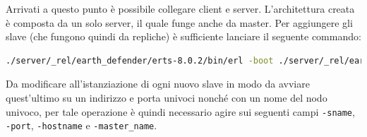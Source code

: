 \documentclass[paper=a4, fontsize=11pt]{scrartcl} %
\numberwithin{equation}{section} %
\numberwithin{figure}{section} %
\numberwithin{table}{section} %
\begin{document}
Arrivati a questo punto è possibile collegare client e server.
L'architettura creata è composta da un solo server, il quale funge anche da master. Per aggiungere gli slave (che fungono quindi da repliche) è sufficiente
lanciare il seguente commando:
\begin{lstlisting}[language=bash]
./server/_rel/earth_defender/erts-8.0.2/bin/erl -boot ./server/_rel/earth_defender/releases/1.0.0/earth_defender -sname 'ketchup' -setcookie 'earth_defender' -port 8889 -hostname "localhost" -role slave -master_name earth_defender@host
\end{lstlisting}
Da modificare all'istanziazione di ogni nuovo slave in modo da avviare quest'ultimo su un indirizzo e porta univoci nonché con un nome del nodo univoco, per tale operazione è quindi necessario agire sui seguenti campi \texttt{-sname}, \texttt{-port}, \texttt{-hostname} e \texttt{-master\_name}.



\end{document}
